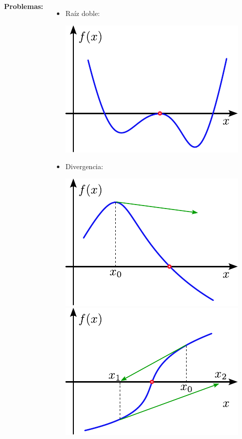 \documentclass[9pt, aspectratio=169]{beamer}
\begin{document}
\begin{frame}[fragile]
	\begin{columns}[t]
		\cx
		\textbf{Problemas:}
		\begin{itemize}
			\item Raíz doble:
			      \begin{center}
				      \includegraphics[scale=0.5]{figs/problemas-01.pdf}
			      \end{center}

			\item Divergencia:
			      \begin{center}
				      \includegraphics[scale=0.5]{figs/problemas-02.pdf}
				      \includegraphics[scale=0.5]{figs/problemas-03.pdf}
			      \end{center}
		\end{itemize}
		\pause


\end{columns}
\end{frame}
\end{document}
